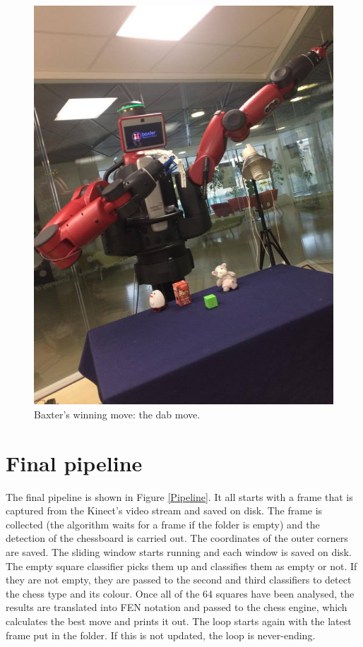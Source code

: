\documentclass{l4proj}
\begin{document}
\begin{itemize}
	\begin{figure}[h!]
	\centering
	\includegraphics[scale=0.4]{dab_move.jpg}
	\caption{Baxter's winning move: the dab move.}
	\label{DABMove}
	\end{figure}
	
\end{itemize}

\pagebreak

\section{Final pipeline}
The final pipeline is shown in Figure \ref{Pipeline}. It all starts with a frame that is captured from the Kinect's video stream and saved on disk. The frame is collected (the algorithm waits for a frame if the folder is empty) and the detection of the chessboard is carried out. The coordinates of the outer corners are saved. The sliding window starts running and each window is saved on disk. The empty square classifier picks them up and classifies them as empty or not. If they are not empty, they are passed to the second and third classifiers to detect the chess type and its colour. Once all of the 64 squares have been analysed, the results are translated into FEN notation and passed to the chess engine, which calculates the best move and prints it out. The loop starts again with the latest frame put in the folder. If this is not updated, the loop is never-ending.
\end{document}
